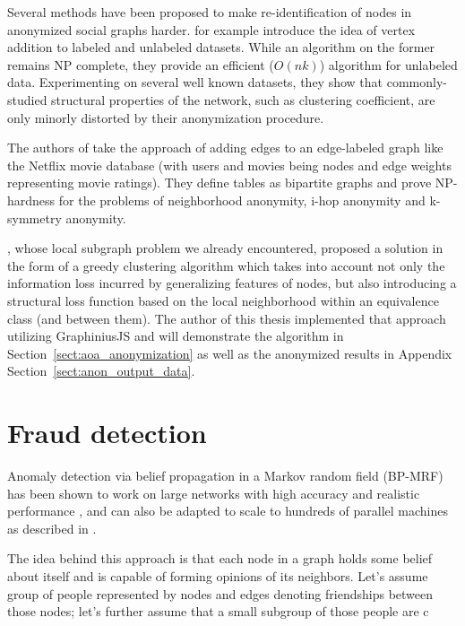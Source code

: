 	Several methods have been proposed to make re-identification of nodes in anonymized social graphs harder.	\cite{chester2011k} for example introduce the idea of vertex addition to labeled and unlabeled datasets. While an algorithm on the former remains NP complete, they provide an efficient ($O(nk)$) algorithm for unlabeled data. Experimenting on several well known datasets, they show that commonly-studied structural properties of the network, such as clustering coefficient, are only minorly distorted by their anonymization procedure.
	
	The authors of \citep{kapron2011social} take the approach of adding edges to an edge-labeled graph like the Netflix movie database (with users and movies being nodes and edge weights representing movie ratings). They define tables as bipartite graphs and prove NP-hardness for the problems of neighborhood anonymity, i-hop anonymity and k-symmetry anonymity.
	
	\cite{campan2009data}, whose local subgraph problem we already encountered, proposed a solution in the form of a greedy clustering algorithm which takes into account not only the information loss incurred by generalizing features of nodes, but also introducing a structural loss function based on the local neighborhood within an equivalence class (and between them). The author of this thesis implemented that approach utilizing GraphiniusJS and will demonstrate the algorithm in Section~\ref{sect:aoa_anonymization} as well as the anonymized results in Appendix Section~\ref{sect:anon_output_data}.		
	
	
	\section{Fraud detection}
	\label{sect:fraud_detection}

	Anomaly detection via belief propagation in a Markov random field (BP-MRF) has been shown to work on large networks with high accuracy and realistic performance \citep{BeliefPropFraudDetection2007}, and can also be adapted to scale to hundreds of parallel machines as described in \citep{BeliefPropBillionNodes2010}.
	
	The idea behind this approach is that each node in a graph holds some belief about itself and is capable of forming opinions of its neighbors. Let's assume group of people represented by nodes and edges denoting friendships between those nodes; let's further assume that a small subgroup of those people are c
